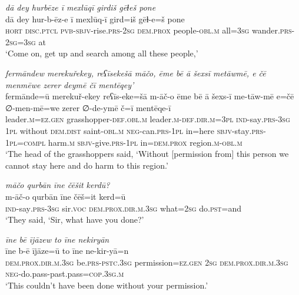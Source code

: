 \ea \label{HB.90}
\textit{dā dey hurbēze ī mexlūqī girdiš gēɫeš pone} \\ 
\gll dā dey hur-b-ēz-e ī mexlūq-ī gird=iš gēɫ-e=š pone \\ 
 \textsc{hort} \textsc{disc.ptcl} \textsc{pvb-}\textsc{sbjv-}rise\textsc{.prs}-\textsc{2sg} \textsc{dem.prox} people\textsc{-obl}\textsc{.m} all\textsc{=3sg} wander\textsc{.prs}-\textsc{2sg}\textsc{=3sg} at \\ 
\glt `Come on, get up and search among all these people,'
\z 
 
\ea \label{PM.5}
\textit{fermāndew merekuřekey, reʕīsekešā māčo, ēme bē ā šexsī metāwmē, e čē menmēwe zerer deymē čī mentēqey’} \\ 
\gll fermānde=ū merekuř-ekey reʕīs-eke=šā m-āč-o ēme bē ā šexs-ī me-tāw-mē e=čē ∅-men-mē=we zerer ∅-de-ymē č=ī mentēqe-ī \\ 
 leader\textsc{.m}\textsc{\textsc{=ez.gen}} grasshopper\textsc{-def}\textsc{.obl}\textsc{.m} leader\textsc{.m}\textsc{-def}\textsc{.dir}\textsc{.m}\textsc{=3pl} \textsc{ind-}say\textsc{.prs}\textsc{-3sg} \textsc{1pl} without \textsc{dem.dist} saint\textsc{-obl}\textsc{.m} \textsc{neg-}can\textsc{.prs}\textsc{-1pl} in=here \textsc{sbjv-}stay\textsc{.prs}\textsc{-1pl}\textsc{=compl} harm\textsc{.m} \textsc{sbjv-}give\textsc{.prs}-\textsc{1pl} in=\textsc{dem.prox} region\textsc{.m}\textsc{-obl}\textsc{.m} \\ 
\glt `The head of the grasshoppers said, ‘Without [permission from] this person we cannot stay here and do harm to this region.'
\z 
 
\ea \label{PM.29}
\textit{māčo qurbān īne čēšit kerdū?} \\ 
\gll m-āč-o qurbān īne čēš=it kerd=ū \\ 
 \textsc{ind-}say\textsc{.prs}\textsc{-3sg} sir.\textsc{voc} \textsc{dem.prox}\textsc{.dir}\textsc{.m}\textsc{.3sg} what\textsc{=\textsc{2sg}} do\textsc{.pst}=and \\ 
\glt `They said, ‘Sir, what have you done?'
\z 
 
\ea \label{PM.30}
\textit{īne bē ījāzew to īne nekiryān} \\ 
\gll īne b-ē ījāze=ū to īne ne-kir-yā=n \\ 
 \textsc{dem.prox}\textsc{.dir}\textsc{.m}\textsc{.3sg} be\textsc{.prs}\textsc{-pstc}\textsc{.3sg} permission\textsc{\textsc{=ez.gen}} \textsc{2sg} \textsc{dem.prox}\textsc{.dir}\textsc{.m}\textsc{.3sg} \textsc{neg-}do.pass-past.pass\textsc{=cop}\textsc{.3sg}\textsc{.m} \\ 
\glt `This couldn’t have been done without your permission.'
\z 
 
